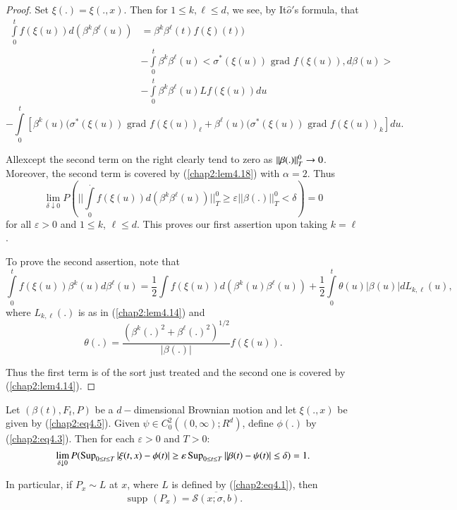 \begin{proof} 
 Set $\xi(.) = \xi(.,x)$. Then for $1 \le k, \ell \le d$, we see, by 
 It$\hat{o}'$s formula, that 
  \begin{align*}
\int\limits_0^t f(\xi(u)) d (\beta^k\beta^\ell(u)) & =
\beta^k\beta^\ell(t)f(\xi)(t))\\ 
& - \int\limits^t_0 \beta^{k} \beta^{\ell}(u) < \sigma^{*} (\xi (u))
\text{ grad } f(\xi (u)),d\beta (u) >\\ 
& - \int\limits^t_0\beta^k\beta^\ell (u)Lf(\xi (u)) du 
 \end{align*} 
 $$
 - \int\limits_0^t [\beta^k(u)(\sigma^*(\xi(u)) \text{ grad } f(\xi
   (u))_\ell + \beta^\ell(u)(\sigma^*(\xi(u)) \text{ grad }
   f(\xi(u))_k] du. 
 $$

 All\pageoriginale except the second term on the right clearly tend to
 zero as $|| 
 \beta(.) ||^0_T\break \rightarrow 0$. Moreover, the second term is covered
 by (\ref{chap2:lem4.18}) with $\alpha = 2$. Thus 
 $$
 \lim_{\delta \downarrow 0} P(||
 \int\limits_0^. f(\xi(u))d(\beta^k\beta^\ell(u)) ||^0_T \ge
 \varepsilon  ||\beta(.)||^0_T < \delta ) = 0 
 $$
 for all $\varepsilon > 0$ and $1 \le k$, $\ell \le d$. This proves our
 first assertion upon taking $k = \ell $. 
 
 To prove the second assertion, note that
{\fontsize{10pt}{12pt}\selectfont 
$$
 \int\limits_0^t f(\xi(u))\beta^k(u)d\beta^\ell(u) = \frac{1}{2} \int
 f(\xi(u))d (\beta^k(u)\beta^\ell(u)) + \frac{1}{2}\int\limits_0^t
 \theta(u) |\beta(u)| dL_{k,\ell}(u), 
 $$}\relax
 where $L_{k,\ell}(.)$ is as in (\ref{chap2:lem4.14}) and
$$
\theta(.) = \frac{(\beta^k(.)^2 +
  \beta^{\ell}(.)^2)^{1/2}}{|\beta(.)|} f(\xi(u)). 
$$

Thus the first term is of the sort just treated and the second one is
covered by (\ref{chap2:lem4.14}). 
\end{proof}

\setcounter{theorem}{19}
\begin{theorem}\label{chap2:thm4.20}%
Let $(\beta(t),F_t,P)$ be a $d-$dimensional Brownian motion and let
$\xi(.,x)$ be given by (\ref{chap2:eq4.5}). Given $\psi \in
C^2_0((0,\infty);R^d)$, define $\phi(.)$ by (\ref{chap2:eq4.3}). Then
for each $\varepsilon > 0$ and $T > 0$:  
$$
\lim_{\delta \downarrow 0} P(\operatorname{Sup}_{0 \le t \le T} | \xi(t,x) -\phi(t) 
| \ge \varepsilon \operatorname{Sup}_{0 \le t \le T} || \beta(t) - \psi(t) | \le
\delta) = 1. 
$$

In particular, if $P_x \sim  L$ at $x$, where $L$ is defined by
(\ref{chap2:eq4.1}), then  
$$
\text{ supp } (P_x) = \overline{\mathscr{S}(x; \sigma ,b)}. 
$$
\end{theorem}

